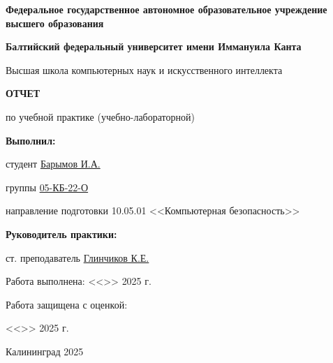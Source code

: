 \documentclass[12pt,a4paper]{article}
\begin{document}
\begin{titlepage}
    \centering
    {\large\textbf{Федеральное государственное автономное образовательное учреждение высшего образования}}\par
    \vspace{0.5cm}
    {\large\textbf{Балтийский федеральный университет имени Иммануила Канта}}\par
    \vspace{0.5cm}
    
    {\large Высшая школа компьютерных наук и искусственного интеллекта}\par
    \vspace{3cm}
    
    {\Large\textbf{ОТЧЕТ}}\par
    \vspace{1cm}
    
    {\Large по учебной практике (учебно-лабораторной)}\par
    \vspace{2cm}
    
    \begin{flushright}
        \large
        \textbf{Выполнил:}\par
        студент \underline{Барымов И.А.}\par
        \vspace{0.5cm}
        группы \underline{05-КБ-22-О}\par
        \vspace{0.5cm}
        направление подготовки 10.05.01 <<Компьютерная безопасность>>\par
        \vspace{2cm}
        
        \textbf{Руководитель практики:}\par
        ст. преподаватель \underline{Глинчиков К.Е.}\par
        \vspace{2cm}
    \end{flushright}
    
    \begin{flushright}
        Работа выполнена:  <<\underline{\hspace{1cm}}>> \underline{\hspace{3cm}} 2025 г.\par
        \vspace{1cm}
        Работа защищена с оценкой: \underline{\hspace{6cm}}\par
        \vspace{1cm}
        <<\underline{\hspace{1cm}}>> \underline{\hspace{3cm}} 2025 г.\par
    \end{flushright}
    
    \vspace{2cm}
    {\large Калининград 2025}
\end{titlepage}
\end{document}
